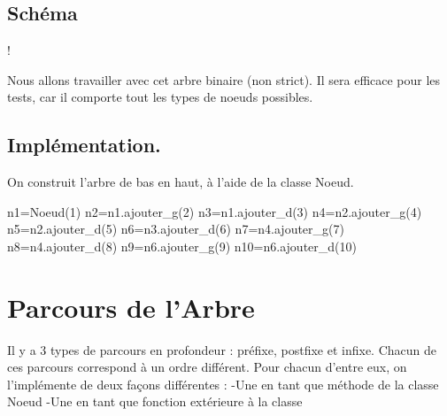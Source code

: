 \documentclass{article}
\begin{document}
\subsection{Schéma}
\begin{center}
\resizebox {\textwidth} {!} {

 }
\end{center}
Nous allons travailler avec cet arbre binaire (non strict). Il sera efficace pour les tests, car il 
comporte tout les types de noeuds possibles.
\subsection{Implémentation.}
On construit l'arbre de bas en haut, à l'aide de la classe Noeud.
\begin{python}
    n1=Noeud(1)
    n2=n1.ajouter_g(2)
    n3=n1.ajouter_d(3)
    n4=n2.ajouter_g(4)
    n5=n2.ajouter_d(5)
    n6=n3.ajouter_d(6)
    n7=n4.ajouter_g(7)
    n8=n4.ajouter_d(8)
    n9=n6.ajouter_g(9)
    n10=n6.ajouter_d(10)
\end{python}

\newpage
\section{Parcours de l'Arbre}
 Il y a 3 types de parcours en profondeur : préfixe, postfixe et infixe.
 Chacun de ces parcours correspond à un ordre différent.
 Pour chacun d'entre eux, on l'implémente de deux façons différentes :
 \newline
 -Une en tant que méthode de la classe Noeud
 \newline
 -Une en tant que fonction extérieure à la classe
\end{document}
